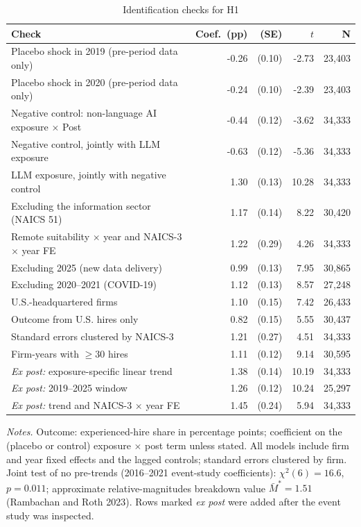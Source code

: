 \begin{table}[!htbp]\centering\footnotesize
\caption{Identification checks for H1}\label{tab:ident}
\begin{tabular}{lrrrr}
\toprule
Check & Coef.\ (pp) & (SE) & $t$ & N \\
\midrule
Placebo shock in 2019 (pre-period data only) & -0.26 & (0.10) & -2.73 & 23,403 \\
Placebo shock in 2020 (pre-period data only) & -0.24 & (0.10) & -2.39 & 23,403 \\
Negative control: non-language AI exposure $\times$ Post & -0.44 & (0.12) & -3.62 & 34,333 \\
Negative control, jointly with LLM exposure & -0.63 & (0.12) & -5.36 & 34,333 \\
LLM exposure, jointly with negative control & 1.30 & (0.13) & 10.28 & 34,333 \\
Excluding the information sector (NAICS 51) & 1.17 & (0.14) & 8.22 & 30,420 \\
Remote suitability $\times$ year and NAICS-3 $\times$ year FE & 1.22 & (0.29) & 4.26 & 34,333 \\
Excluding 2025 (new data delivery) & 0.99 & (0.13) & 7.95 & 30,865 \\
Excluding 2020--2021 (COVID-19) & 1.12 & (0.13) & 8.57 & 27,248 \\
U.S.-headquartered firms & 1.10 & (0.15) & 7.42 & 26,433 \\
Outcome from U.S. hires only & 0.82 & (0.15) & 5.55 & 30,437 \\
Standard errors clustered by NAICS-3 & 1.21 & (0.27) & 4.51 & 34,333 \\
Firm-years with $\ge$30 hires & 1.11 & (0.12) & 9.14 & 30,595 \\
\textit{Ex post:} exposure-specific linear trend & 1.38 & (0.14) & 10.19 & 34,333 \\
\textit{Ex post:} 2019--2025 window & 1.26 & (0.12) & 10.24 & 25,297 \\
\textit{Ex post:} trend and NAICS-3 $\times$ year FE & 1.45 & (0.24) & 5.94 & 34,333 \\
\bottomrule
\end{tabular}
\begin{minipage}{0.95\linewidth}\vspace{2pt}\scriptsize\textit{Notes.} Outcome: experienced-hire share in percentage points; coefficient on the (placebo or control) exposure $\times$ post term unless stated. All models include firm and year fixed effects and the lagged controls; standard errors clustered by firm. Joint test of no pre-trends (2016--2021 event-study coefficients): $\chi^2(6)=16.6$, $p=0.011$; approximate relative-magnitudes breakdown value $\bar M^*=1.51$ (Rambachan and Roth 2023). Rows marked \textit{ex post} were added after the event study was inspected.\end{minipage}
\end{table}